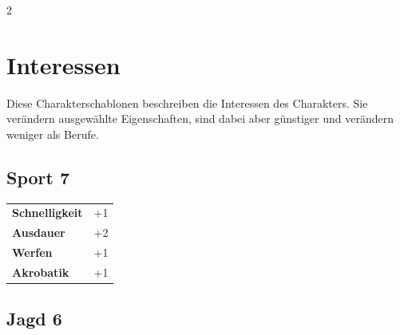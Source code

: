 \begin{multicols}{2}
\begin{tcolorbox}

\end{tcolorbox}

\section{Interessen}

Diese Charakterschablonen beschreiben die Interessen des Charakters. Sie verändern ausgewählte Eigenschaften, sind dabei aber günstiger und verändern weniger als Berufe.

\begin{tcolorbox}
    \subsection*{Sport \hfill \small{7 }}
    \tcblower




\begin{tabular}{@{}ll@{}}
    \textbf{Schnelligkeit} & +1\\
    \textbf{Ausdauer} & +2\\
    \textbf{Werfen} & +1\\
    \textbf{Akrobatik} & +1\\
\end{tabular}


\end{tcolorbox}

\begin{tcolorbox}
    \subsection*{Jagd \hfill \small{6 }}
    \tcblower





\end{tcolorbox}
\end{multicols}
